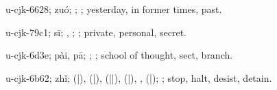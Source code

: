 \begin{multicols}{2}
{\cjkgGlue{}u-cjk-6628; zuó; \cjkgGlue{}; \cjkgGlue{}; yesterday, in former times, past.

\cjkgGlue{}u-cjk-79c1; sī; \cjkgGlue{}, \cjkgGlue{}; \cjkgGlue{}; private, personal, secret.

\cjkgGlue{}u-cjk-6d3e; pài, pā; \cjkgGlue{}; \cjkgGlue{}; school of thought, sect, branch.

\cjkgGlue{}u-cjk-6b62; zhǐ; \cjkgGlue{}\cjkgGlue{}(\cjkgGlue{}|\cjkgGlue{}), \cjkgGlue{}\cjkgGlue{}(\cjkgGlue{}|\cjkgGlue{}), \cjkgGlue{}\cjkgGlue{}(\cjkgGlue{}|\cjkgGlue{}|\cjkgGlue{}), \cjkgGlue{}\cjkgGlue{}(\cjkgGlue{}|\cjkgGlue{}), \cjkgGlue{}\cjkgGlue{}\cjkgGlue{}, \cjkgGlue{}\cjkgGlue{}(\cjkgGlue{}|\cjkgGlue{}); \cjkgGlue{}; stop, halt, desist, detain.

}
\end{multicols}
